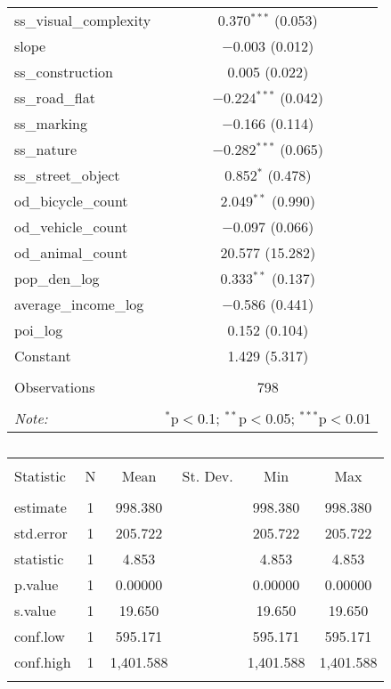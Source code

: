 \begin{table}[!htbp]
\begin{tabular}{@{\extracolsep{1pt}}lc}
  ss\_visual\_complexity & 0.370$^{***}$ (0.053) \\ 
  slope & $-$0.003 (0.012) \\ 
  ss\_construction & 0.005 (0.022) \\ 
  ss\_road\_flat & $-$0.224$^{***}$ (0.042) \\ 
  ss\_marking & $-$0.166 (0.114) \\ 
  ss\_nature & $-$0.282$^{***}$ (0.065) \\ 
  ss\_street\_object & 0.852$^{*}$ (0.478) \\ 
  od\_bicycle\_count & 2.049$^{**}$ (0.990) \\ 
  od\_vehicle\_count & $-$0.097 (0.066) \\ 
  od\_animal\_count & 20.577 (15.282) \\ 
  pop\_den\_log & 0.333$^{**}$ (0.137) \\ 
  average\_income\_log & $-$0.586 (0.441) \\ 
  poi\_log & 0.152 (0.104) \\ 
  Constant & 1.429 (5.317) \\ 
 \hline \\[-1.8ex] 
Observations & 798 \\ 
\hline 
\hline \\[-1.8ex] 
\textit{Note:}  & \multicolumn{1}{r}{$^{*}$p$<$0.1; $^{**}$p$<$0.05; $^{***}$p$<$0.01} \\ 
\end{tabular} 
\end{table} 

\begin{table}[!htbp] \centering 
  \caption{} 
  \label{} 
\small 
\begin{tabular}{@{\extracolsep{1pt}}lccccc} 
\\[-1.8ex]\hline 
\hline \\[-1.8ex] 
Statistic & \multicolumn{1}{c}{N} & \multicolumn{1}{c}{Mean} & \multicolumn{1}{c}{St. Dev.} & \multicolumn{1}{c}{Min} & \multicolumn{1}{c}{Max} \\ 
\hline \\[-1.8ex] 
estimate & 1 & 998.380 &  & 998.380 & 998.380 \\ 
std.error & 1 & 205.722 &  & 205.722 & 205.722 \\ 
statistic & 1 & 4.853 &  & 4.853 & 4.853 \\ 
p.value & 1 & 0.00000 &  & 0.00000 & 0.00000 \\ 
s.value & 1 & 19.650 &  & 19.650 & 19.650 \\ 
conf.low & 1 & 595.171 &  & 595.171 & 595.171 \\ 
conf.high & 1 & 1,401.588 &  & 1,401.588 & 1,401.588 \\ 
\hline \\[-1.8ex] 
\end{tabular} 
\end{table} 

